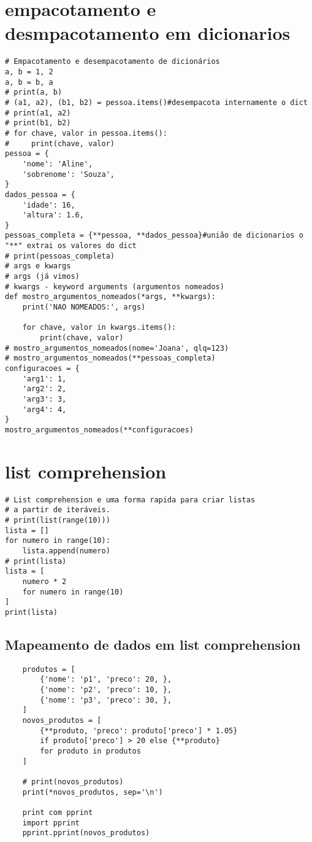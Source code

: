 \documentclass{article}
\begin{document}
\section{empacotamento e desmpacotamento em dicionarios}
\begin{lstlisting}
# Empacotamento e desempacotamento de dicionários
a, b = 1, 2
a, b = b, a
# print(a, b)
# (a1, a2), (b1, b2) = pessoa.items()#desempacota internamente o dict
# print(a1, a2)
# print(b1, b2)
# for chave, valor in pessoa.items():
#     print(chave, valor)
pessoa = {
    'nome': 'Aline',
    'sobrenome': 'Souza',
}
dados_pessoa = {
    'idade': 16,
    'altura': 1.6,
}
pessoas_completa = {**pessoa, **dados_pessoa}#união de dicionarios o "**" extrai os valores do dict
# print(pessoas_completa)
# args e kwargs
# args (já vimos)
# kwargs - keyword arguments (argumentos nomeados)
def mostro_argumentos_nomeados(*args, **kwargs):
    print('NAO NOMEADOS:', args)

    for chave, valor in kwargs.items():
        print(chave, valor)
# mostro_argumentos_nomeados(nome='Joana', qlq=123)
# mostro_argumentos_nomeados(**pessoas_completa)
configuracoes = {
    'arg1': 1,
    'arg2': 2,
    'arg3': 3,
    'arg4': 4,
}
mostro_argumentos_nomeados(**configuracoes)
\end{lstlisting}
\section{list comprehension}
\begin{lstlisting}
# List comprehension e uma forma rapida para criar listas
# a partir de iteráveis.
# print(list(range(10)))
lista = []
for numero in range(10):
    lista.append(numero)
# print(lista)
lista = [
    numero * 2
    for numero in range(10)
]
print(lista)   
\end{lstlisting}
\subsection{Mapeamento de dados em list comprehension}
\begin{lstlisting}
    produtos = [
        {'nome': 'p1', 'preco': 20, },
        {'nome': 'p2', 'preco': 10, },
        {'nome': 'p3', 'preco': 30, },
    ]
    novos_produtos = [
        {**produto, 'preco': produto['preco'] * 1.05}
        if produto['preco'] > 20 else {**produto}
        for produto in produtos
    ]
    
    # print(novos_produtos)
    print(*novos_produtos, sep='\n')

    print com pprint 
    import pprint
    pprint.pprint(novos_produtos)

\end{lstlisting}
\end{document}
